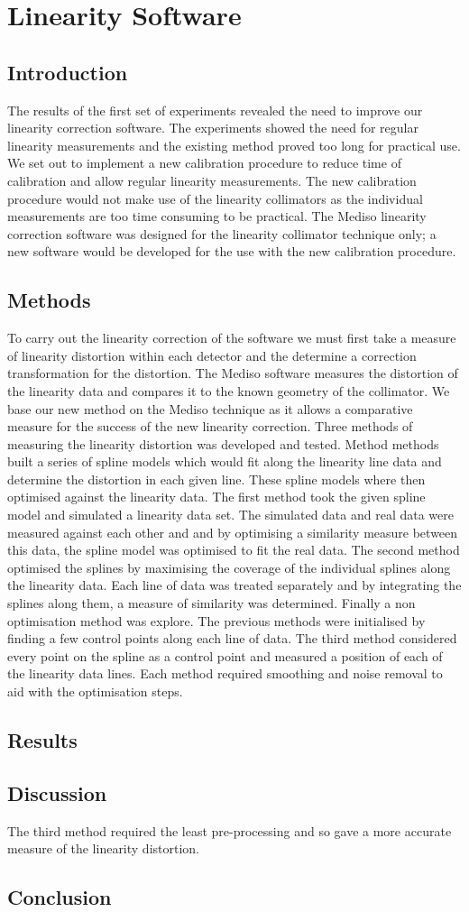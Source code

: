 \chapter{Linearity Software}
\label{Linearity}


\section{Introduction}
The results of the first set of experiments revealed the need to improve our linearity correction software. The experiments showed the need for regular linearity measurements and the existing method proved too long for practical use. We set out to implement a new calibration procedure to reduce time of calibration and allow regular linearity measurements. 
The new calibration procedure would not make use of the linearity collimators as the individual measurements are too time consuming to be practical. 
The Mediso linearity correction software was designed for the linearity collimator technique only; a new software would be developed for the use with the new calibration procedure. 
\section{Methods}
To carry out the linearity correction of the software we must first take a measure of linearity distortion within each detector and the determine a correction transformation for the distortion. The Mediso software measures the distortion of the linearity data and compares it to the known geometry of the collimator. We base our new method on the Mediso technique as it allows a comparative measure for the success of the new linearity correction. Three methods of measuring the linearity distortion was developed and tested. Method methods built a series of spline models which would fit along the linearity line data and determine the distortion in each given line. These spline models where then optimised against the linearity data. The first method took the given spline model and simulated a linearity data set. The simulated data and real data were measured against each other and and by optimising a similarity measure between this data, the spline model was optimised to fit the real data.
The second method optimised the splines by maximising the coverage of the individual splines along the linearity data. Each line of data was treated separately and by integrating the splines along them, a measure of similarity was determined. 
Finally a non optimisation method was explore. The previous methods were initialised by finding a few control points along each line of data. The third method considered every point on the spline as a control point and measured a position of each of the linearity data lines. 
Each method required smoothing and noise removal to aid with the optimisation steps. 
\section{Results}

\section{Discussion}
The third method required the least pre-processing and so gave a more accurate measure of the linearity distortion.
\section{Conclusion}